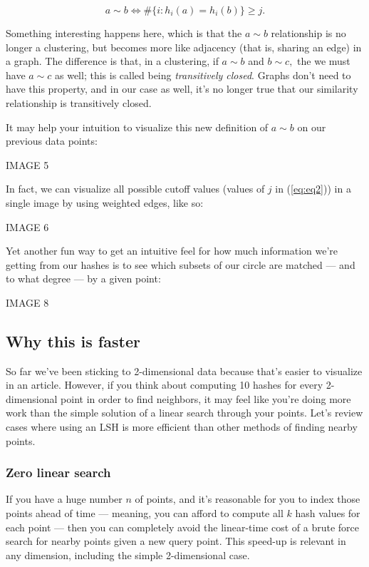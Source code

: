 \documentclass[20pt,]{extarticle}
\begin{document}
\begin{equation} a \sim b \iff \#\{i: h_i(a) = h_i(b)\} \ge j. \label{eq:eq2}\end{equation}

Something interesting happens here, which is that the \(a \sim b\)
relationship is no longer a clustering, but becomes more like adjacency
(that is, sharing an edge) in a graph. The difference is that, in a
clustering, if \(a\sim b\) and \(b\sim c,\) the we must have \(a\sim c\)
as well; this is called being \emph{transitively closed}. Graphs don't
need to have this property, and in our case as well, it's no longer true
that our similarity relationship is transitively closed.

It may help your intuition to visualize this new definition of
\(a\sim b\) on our previous data points:

IMAGE 5

In fact, we can visualize all possible cutoff values (values of \(j\) in
(\ref{eq:eq2})) in a single image by using weighted edges, like so:

IMAGE 6

Yet another fun way to get an intuitive feel for how much information
we're getting from our hashes is to see which subsets of our circle are
matched --- and to what degree --- by a given point:

IMAGE 8

\subsection{Why this is faster}\label{why-this-is-faster}

So far we've been sticking to 2-dimensional data because that's easier
to visualize in an article. However, if you think about computing 10
hashes for every 2-dimensional point in order to find neighbors, it may
feel like you're doing more work than the simple solution of a linear
search through your points. Let's review cases where using an LSH is
more efficient than other methods of finding nearby points.

\subsubsection{Zero linear search}\label{zero-linear-search}

If you have a huge number \(n\) of points, and it's reasonable for you
to index those points ahead of time --- meaning, you can afford to
compute all \(k\) hash values for each point --- then you can completely
avoid the linear-time cost of a brute force search for nearby points
given a new query point. This speed-up is relevant in any dimension,
including the simple 2-dimensional case.
\end{document}
